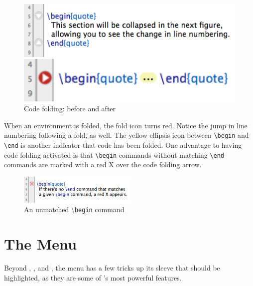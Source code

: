 \begin{figure}[htbp]
\begin{minipage}{0.55\textwidth}
\begin{flushleft}
\includegraphics[width=1.0\textwidth]{TeXnicle-Images/texnicle-codefold-open.png}
\end{flushleft}
\end{minipage}
\begin{minipage}{0.45\textwidth}
\begin{flushright}
\includegraphics[width=1.0\textwidth]{TeXnicle-Images/texnicle-codefold-closed.png}
\end{flushright}
\end{minipage}
\caption{Code folding: before and after}
\label{fig:texnicle-codefold}
\end{figure}                  
 
When an environment is folded, the fold icon turns red. Notice the jump in line numbering following a fold, as well. The yellow ellipsis icon between \verb|\begin| and \verb|\end| is another indicator that code has been folded. One advantage to having code folding activated is that \verb|\begin| commands without matching \verb|\end| commands are marked with a red X over the code folding arrow.
\begin{figure}[htbp]
\centering
\includegraphics[width=0.5\textwidth]{TeXnicle-Images/texnicle-codefold-nomatch.png}
\caption{An unmatched \textbackslash\texttt{begin} command}
\label{fig:texnicle-codefold-nomatch}
\end{figure}

\section[The Edit Menu]{The  Menu}
\label{reference.editmenu}
Beyond , , and , the  menu has a few tricks up its sleeve that should be highlighted, as they are some of \texnicle's most powerful features.

